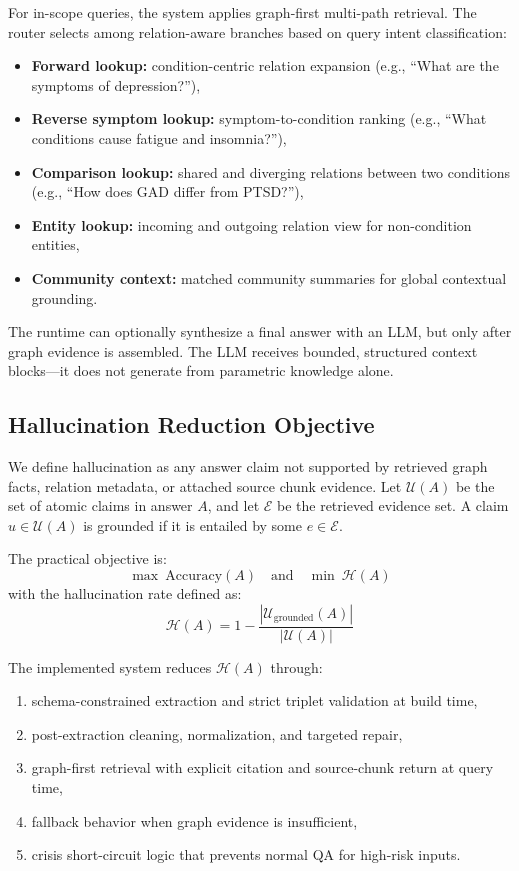 \documentclass[12pt,a4paper]{article}
\begin{document}
For in-scope queries, the system applies graph-first multi-path retrieval. The router selects among relation-aware branches based on query intent classification:
\begin{itemize}[nosep]
    \item \textbf{Forward lookup:} condition-centric relation expansion (e.g., ``What are the symptoms of depression?''),
    \item \textbf{Reverse symptom lookup:} symptom-to-condition ranking (e.g., ``What conditions cause fatigue and insomnia?''),
    \item \textbf{Comparison lookup:} shared and diverging relations between two conditions (e.g., ``How does GAD differ from PTSD?''),
    \item \textbf{Entity lookup:} incoming and outgoing relation view for non-condition entities,
    \item \textbf{Community context:} matched community summaries for global contextual grounding.
\end{itemize}

The runtime can optionally synthesize a final answer with an LLM, but only after graph evidence is assembled. The LLM receives bounded, structured context blocks---it does not generate from parametric knowledge alone.

\subsection{Hallucination Reduction Objective}

We define hallucination as any answer claim not supported by retrieved graph facts, relation metadata, or attached source chunk evidence. Let $\mathcal{U}(A)$ be the set of atomic claims in answer $A$, and let $\mathcal{E}$ be the retrieved evidence set. A claim $u \in \mathcal{U}(A)$ is grounded if it is entailed by some $e \in \mathcal{E}$.

The practical objective is:
\begin{equation}
    \max\ \text{Accuracy}(A) \quad \text{and} \quad \min\ \mathcal{H}(A)
\end{equation}
with the hallucination rate defined as:
\begin{equation}
    \mathcal{H}(A) = 1 - \frac{|\mathcal{U}_{\text{grounded}}(A)|}{|\mathcal{U}(A)|}
\end{equation}

The implemented system reduces $\mathcal{H}(A)$ through:
\begin{enumerate}[nosep]
    \item schema-constrained extraction and strict triplet validation at build time,
    \item post-extraction cleaning, normalization, and targeted repair,
    \item graph-first retrieval with explicit citation and source-chunk return at query time,
    \item fallback behavior when graph evidence is insufficient,
    \item crisis short-circuit logic that prevents normal QA for high-risk inputs.
\end{enumerate}
\end{document}
